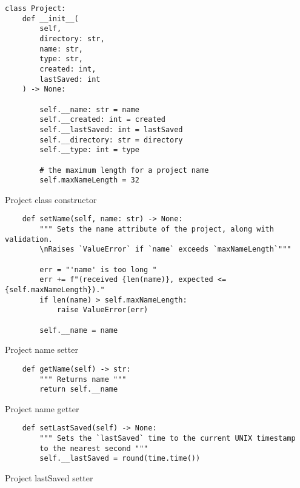
\newpage
\begin{listing}[!h]
    \begin{verbatim}
class Project:
    def __init__(
        self, 
        directory: str, 
        name: str, 
        type: str,
        created: int, 
        lastSaved: int
    ) -> None:
        
        self.__name: str = name
        self.__created: int = created
        self.__lastSaved: int = lastSaved
        self.__directory: str = directory
        self.__type: int = type
        
        # the maximum length for a project name
        self.maxNameLength = 32
    \end{verbatim}
    \caption{Project class constructor}
    \label{sc:project-init}
\end{listing}

\newpage
\begin{listing}[!h]
    \begin{verbatim}
    def setName(self, name: str) -> None:
        """ Sets the name attribute of the project, along with validation.
        \nRaises `ValueError` if `name` exceeds `maxNameLength`"""
        
        err = "'name' is too long "
        err += f"(received {len(name)}, expected <= {self.maxNameLength})."
        if len(name) > self.maxNameLength:
            raise ValueError(err)
        
        self.__name = name
    \end{verbatim}
    \caption{Project name setter}
    \label{sc:project-name-setter}
\end{listing}

\newpage
\begin{listing}[!h]
    \begin{verbatim}
    def getName(self) -> str:
        """ Returns name """
        return self.__name
    \end{verbatim}
    \caption{Project name getter}
    \label{sc:project-name-getter}
\end{listing}

\newpage
\begin{listing}[!h]
    \begin{verbatim}
    def setLastSaved(self) -> None:
        """ Sets the `lastSaved` time to the current UNIX timestamp
        to the nearest second """
        self.__lastSaved = round(time.time())
    \end{verbatim}
    \caption{Project lastSaved setter}
    \label{sc:project-lastsaved-setter}
\end{listing}

